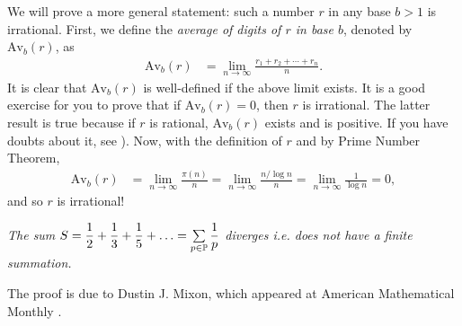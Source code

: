 \begin{solution}
	We will prove a more general statement: such a number $r$ in any base $b>1$ is irrational. First, we define the \textit{average of digits of $r$ in base $b$}, denoted by $\text{Av}_b(r)$, as
	\begin{align*}
	\text{Av}_b(r) &= \lim_{n\to \infty} \frac{r_1+r_2+\cdots+r_n}{n}.
	\end{align*}
	It is clear that $\text{Av}_b(r)$ is well-defined if the above limit exists. It is a good exercise for you to prove that if $\text{Av}_b(r)=0$, then $r$ is irrational. The latter result is true because if $r$ is rational, $\text{Av}_b(r)$ exists and is positive. If you have doubts about it, see \cite{ch:primes-nasehpour}). Now, with the definition of $r$ and by Prime Number Theorem,
	\begin{align*}
	\text{Av}_b(r) &= \lim_{n\to \infty} \frac{\pi(n)}{n} =  \lim_{n\to \infty} \frac{n/\log n}{n} =  \lim_{n\to \infty} \frac{1}{\log n} = 0,
	\end{align*}
	and so $r$ is irrational!
\end{solution}
	\begin{theorem}[Euler]\sl
		The sum $S=\dfrac{1}{2}+\dfrac{1}{3}+\dfrac{1}{5}+\ldots=\sum\limits_{p\in\P }\dfrac{1}{p}$ diverges i.e. does not have a finite summation.
	\end{theorem}
The proof is due to Dustin J. Mixon, which appeared at American Mathematical Monthly \cite{dustin}.
